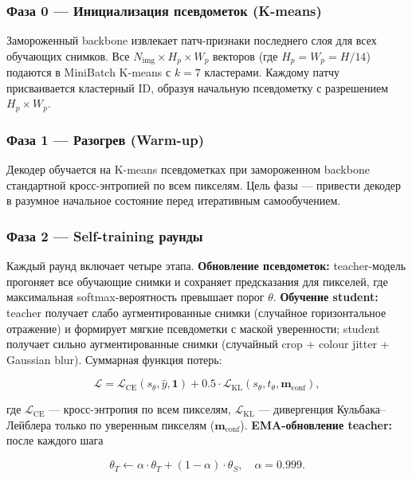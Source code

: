 \documentclass[11pt,a4paper]{article}
\begin{document}
\subsubsection{Фаза 0 --- Инициализация псевдометок (K-means)}

Замороженный backbone извлекает патч-признаки последнего слоя для всех обучающих снимков.
Все $N_\text{img} \times H_p \times W_p$ векторов (где $H_p = W_p = H/14$) подаются в
MiniBatch K-means с $k{=}7$ кластерами. Каждому патчу присваивается кластерный ID,
образуя начальную псевдометку с разрешением $H_p \times W_p$.

\subsubsection{Фаза 1 --- Разогрев (Warm-up)}

Декодер обучается на K-means псевдометках при замороженном backbone стандартной
кросс-энтропией по всем пикселям. Цель фазы --- привести декодер в разумное начальное
состояние перед итеративным самообучением.

\subsubsection{Фаза 2 --- Self-training раунды}

Каждый раунд включает четыре этапа. \textbf{Обновление псевдометок:} teacher-модель
прогоняет все обучающие снимки и сохраняет предсказания для пикселей, где максимальная
softmax-вероятность превышает порог $\theta$. \textbf{Обучение student:} teacher
получает слабо аугментированные снимки (случайное горизонтальное отражение) и формирует
мягкие псевдометки с маской уверенности; student получает сильно аугментированные снимки
(случайный crop + colour jitter + Gaussian blur). Суммарная функция потерь:

\begin{equation}
  \mathcal{L} = \mathcal{L}_\text{CE}(s_\theta, \hat{y}, \mathbf{1}) +
                0.5 \cdot \mathcal{L}_\text{KL}(s_\theta, t_\theta, \mathbf{m}_\text{conf}),
  \label{eq:loss}
\end{equation}

\noindent где $\mathcal{L}_\text{CE}$ --- кросс-энтропия по всем пикселям,
$\mathcal{L}_\text{KL}$ --- дивергенция Кульбака--Лейблера только по уверенным пикселям
($\mathbf{m}_\text{conf}$). \textbf{EMA-обновление teacher:} после каждого шага

\begin{equation}
  \theta_T \leftarrow \alpha \cdot \theta_T + (1 - \alpha) \cdot \theta_S, \quad \alpha = 0.999.
  \label{eq:ema}
\end{equation}
\end{document}
